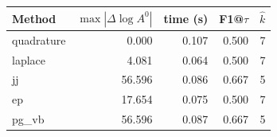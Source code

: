 \begin{tabular}{lrrrr}\toprule
Method & $\max|\Delta \log A^0|$ & time (s) & F1@$\tau$ & $\hat{k}$\\\midrule
quadrature & 0.000 & 0.107 & 0.500 & 7\\
laplace & 4.081 & 0.064 & 0.500 & 7\\
jj & 56.596 & 0.086 & 0.667 & 5\\
ep & 17.654 & 0.075 & 0.500 & 7\\
pg_vb & 56.596 & 0.087 & 0.667 & 5\\
\bottomrule\end{tabular}
